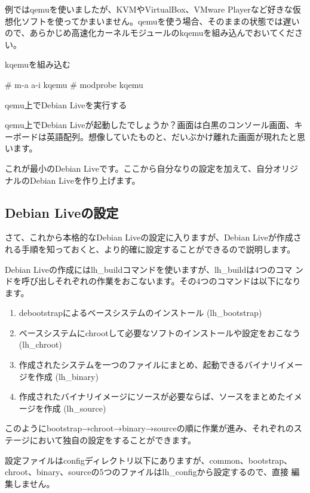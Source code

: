 \documentclass[mingoth,a4paper]{jsarticle}
\begin{document}
例ではqemuを使いましたが、KVMやVirtualBox、VMware Playerなど好きな仮想化ソフトを使ってかまいません。qemuを使う場合、そのままの状態では遅いので、あらかじめ高速化カーネルモジュールのkqemuを組み込んでおいてください。

kqemuを組み込む
\begin{commandline}
 # m-a a-i kqemu
 # modprobe kqemu
\end{commandline}

qemu上でDebian Liveを実行する

qemu上でDebian Liveが起動したでしょうか？画面は白黒のコンソール画面、キーボードは英語配列。想像していたものと、だいぶかけ離れた画面が現れたと思います。

これが最小のDebian Liveです。ここから自分なりの設定を加えて、自分オリジナルのDebian Liveを作り上げます。

\newpage

\subsection{Debian Liveの設定}
さて、これから本格的なDebian Liveの設定に入りますが、Debian Liveが作成される手順を知っておくと、より的確に設定することができるので説明します。

Debian Liveの作成にはlh\_buildコマンドを使いますが、lh\_buildは4つのコマ
ンドを呼び出しそれぞれの作業をおこないます。その4つのコマンドは以下になります。

\begin{enumerate}
 \item debootstrapによるベースシステムのインストール (lh\_bootstrap)
 \item ベースシステムにchrootして必要なソフトのインストールや設定をおこなう(lh\_chroot)
 \item 作成されたシステムを一つのファイルにまとめ、起動できるバイナリイメージを作成 (lh\_binary)
 \item 作成されたバイナリイメージにソースが必要ならば、ソースをまとめたイメージを作成 (lh\_source)
\end{enumerate}

このようにbootstrap→chroot→binary→sourceの順に作業が進み、それぞれのステージにおいて独自の設定をすることができます。

設定ファイルはconfigディレクトリ以下にありますが、common、bootstrap、
chroot、binary、sourceの5つのファイルはlh\_configから設定するので、直接
編集しません。
\end{document}
